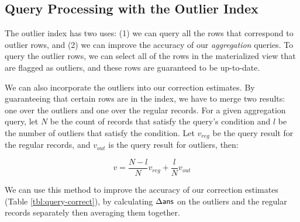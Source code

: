 \subsection{Query Processing with the Outlier Index} 
The outlier index has two uses: (1) we can query all the rows that correspond to outlier rows, 
and (2) we can improve the accuracy of our \emph{aggregation} queries.
To query the outlier rows, we can select all of the rows in the materialized view that are flagged as outliers, and these rows are guaranteed to be up-to-date.

We can also incorporate the outliers into our correction estimates.  
By guaranteeing that certain rows are in the index, we
have to merge two results: one over the outliers and one over the regular records.
For a given aggregation query, let $N$ be the count of records that satisfy the query's condition and $l$ be the number of outliers that satisfy the condition.
Let $v_{reg}$ be the query result for the regular records, and $v_{out}$ is the query result for outliers, then:

\[
 v = \frac{N-l}{N}v_{reg} + \frac{l}{N}v_{out}
\]

We can use this method to improve the accuracy of our correction estimates (Table \ref{tbl:query-correct}), by calculating $\Delta\textsf{ans}$ 
on the outliers and the regular records separately then averaging them together. 
